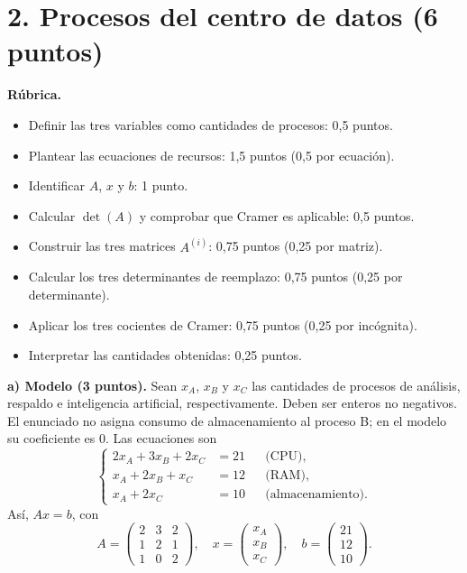 \documentclass[10pt,a4]{examenEPN0}
\begin{document}
\section*{2. Procesos del centro de datos (6 puntos)}
\noindent\textbf{Rúbrica.}
\begin{itemize}[itemsep=2pt]
    \item Definir las tres variables como cantidades de procesos: 0,5 puntos.
    \item Plantear las ecuaciones de recursos: 1,5 puntos (0,5 por ecuación).
    \item Identificar $A$, $x$ y $b$: 1 punto.
    \item Calcular $\det(A)$ y comprobar que Cramer es aplicable: 0,5 puntos.
    \item Construir las tres matrices $A^{(i)}$: 0,75 puntos (0,25 por matriz).
    \item Calcular los tres determinantes de reemplazo: 0,75 puntos (0,25 por determinante).
    \item Aplicar los tres cocientes de Cramer: 0,75 puntos (0,25 por incógnita).
    \item Interpretar las cantidades obtenidas: 0,25 puntos.
\end{itemize}
\noindent\textbf{a) Modelo (3 puntos).}
Sean $x_A$, $x_B$ y $x_C$ las cantidades de procesos de análisis,
respaldo e inteligencia artificial, respectivamente. Deben ser enteros no negativos.
El enunciado no asigna consumo de almacenamiento al proceso B; en el modelo
su coeficiente es 0. Las ecuaciones son
\[
    \left\{\begin{aligned}
        2x_A+3x_B+2x_C&=21 &&\text{(CPU)},\\
        x_A+2x_B+x_C&=12 &&\text{(RAM)},\\
        x_A+2x_C&=10 &&\text{(almacenamiento)}.
    \end{aligned}\right.
\]
Así, $Ax=b$, con
\[
    A=\begin{pmatrix}2&3&2\\1&2&1\\1&0&2\end{pmatrix},\quad
    x=\begin{pmatrix}x_A\\x_B\\x_C\end{pmatrix},\quad
    b=\begin{pmatrix}21\\12\\10\end{pmatrix}.
\]
\end{document}
